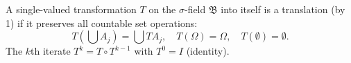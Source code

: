 A single-valued transformation $T$ on the $\sigma$-field $\mathfrak{B}$ into itself is a translation (by 1) if it preserves all countable set operations:
$$T\left(\bigcup A_j\right) = \bigcup T A_j, \quad T(\Omega) = \Omega, \quad T(\emptyset) = \emptyset.$$
The $k$th iterate $T^k = T \circ T^{k-1}$ with $T^0 = I$ (identity).
